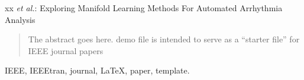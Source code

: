 \documentclass[journal]{IEEEtran}
\begin{document}
\markboth{}%
{xx \MakeLowercase{\textit{et al.}}: Exploring Manifold Learning Methods For Automated Arrhythmia Analysis}
% 











\maketitle

\begin{abstract}
The abstract goes here. demo file is intended to serve as a ``starter file''
for IEEE journal papers 
\end{abstract}

\begin{IEEEkeywords}
IEEE, IEEEtran, journal, \LaTeX, paper, template.
\end{IEEEkeywords}






%
\IEEEpeerreviewmaketitle
\end{document}
